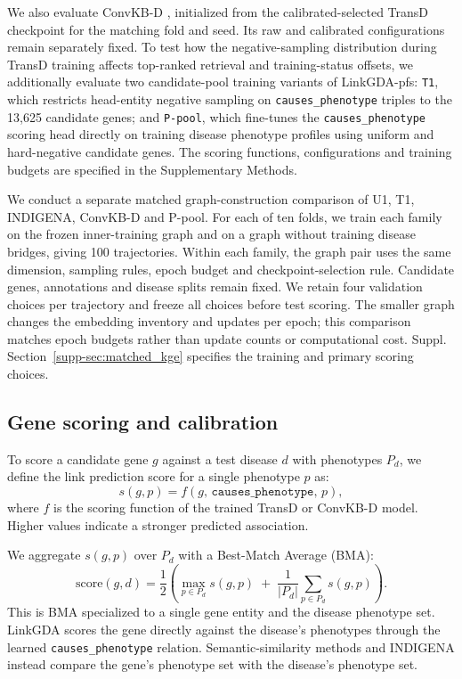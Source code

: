 \documentclass[webpdf,contemporary,large]{oup-authoring-template}%
\theoremstyle{thmstyleone}%
\theoremstyle{thmstyletwo}%
\theoremstyle{thmstylethree}%
\newcommand{\method}{LinkGDA}
\renewcommand{\cite}{\citep}
\begin{document}
We also evaluate ConvKB-D \cite{nguyen-etal-2018-novel,indigena}, initialized
from the calibrated-selected TransD checkpoint for the matching fold and seed.
Its raw and calibrated configurations remain separately fixed. To test how the
negative-sampling distribution during TransD training affects top-ranked
retrieval and training-status offsets, we additionally evaluate two
candidate-pool training variants of \method{}-pfs: \texttt{T1}, which restricts
head-entity negative sampling on \texttt{causes\_phenotype} triples to the
13{,}625 candidate genes; and \texttt{P-pool}, which fine-tunes the
\texttt{causes\_phenotype} scoring head directly on training disease phenotype
profiles using uniform and hard-negative candidate genes. The scoring
functions, configurations and training budgets are specified in the
Supplementary Methods.

We conduct a separate matched graph-construction comparison of U1, T1,
INDIGENA, ConvKB-D and P-pool. For each of ten folds, we train each family
on the frozen inner-training graph and on a graph without training disease
bridges, giving 100 trajectories. Within each family, the graph pair uses the
same dimension, sampling rules, epoch budget and checkpoint-selection rule.
Candidate genes, annotations and disease splits remain fixed. We retain four
validation choices per trajectory and freeze all choices before test scoring.
The smaller graph changes the embedding inventory and updates per epoch;
this comparison matches epoch budgets rather than update counts or computational
cost. Suppl. Section~\ref{supp-sec:matched_kge} specifies the training and
primary scoring choices.

\subsection{Gene scoring and calibration}
\label{sec:scoring}

To score a candidate gene $g$ against a
test disease $d$ with phenotypes $P_d$, we define the link prediction
score for a single phenotype $p$ as:
\begin{equation}
  s(g, p) = f(g,\,\texttt{causes\_phenotype},\,p),
\end{equation}
where $f$ is the scoring function of the trained TransD or ConvKB-D model.
Higher values indicate a stronger predicted association.

We aggregate $s(g, p)$ over $P_d$ with a
Best-Match Average (BMA):
\begin{equation}
  \label{eq:bma}
  \text{score}(g, d) = \frac{1}{2}\!\left(
    \max_{p \in P_d} s(g, p)
    \;+\;
    \frac{1}{|P_d|}\sum_{p \in P_d} s(g, p)
  \right).
\end{equation}
This is BMA specialized to a single gene entity and the disease phenotype set.
\method{} scores the gene directly against the disease's phenotypes through
the learned \texttt{causes\_phenotype} relation. Semantic-similarity methods
and INDIGENA \cite{indigena} instead compare the gene's phenotype set with
the disease's phenotype set.
\end{document}
